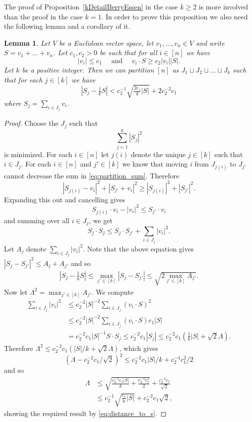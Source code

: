 \documentclass[10pt, english,oneside,reqno]{amsart}
\theoremstyle{plain}
\newtheorem{lemma}[theorem]{Lemma}
\theoremstyle{remark}
\numberwithin{equation}{section}
\numberwithin{figure}{section}
\begin{document}
The proof of Proposition~\ref{kDetailBerryEssen} in the case $k \geq 2$ is more involved than the proof in the case $k=1$. In order to prove this proposition we also need the following lemma and a corollary of it.

\begin{lemma}\label{EucVecLemma}
    Let $V$ be a Euclidean vector space, let $v_1, \dots, v_n \in V$ and write $S =  v_1 + \dots + v_n$. Let $c_1, c_2 > 0$ be such that for all $i \in [n]$ we have $$|v_i| \leq c_1 \quad \text{ and } \quad v_i \cdot S \geq c_2 |v_i| |S|.$$ Let $k$ be a positive integer. Then we can partition $[n]$ as $J_1 \sqcup J_2 \sqcup \dots \sqcup J_k$ such that for each $j \in [k]$ we have $$|S_j - \tfrac{1}{k}S| < c_2^{-1} \sqrt{\tfrac{2c_1}{k}|S|} + 2 c_2^{-2} c_1$$
    where $S_j = \sum_{i \in J_j} v_i$.
\end{lemma}

\begin{proof}
    Choose the $J_j$ such that 
    \begin{equation}
        \sum_{j=1}^{k} | S_j |^2 \label{eq:partition_sum}
    \end{equation} is minimized. For each $i \in [n]$ let $j(i)$ denote the unique $j \in [k]$ such that $i \in J_j$. For each $i \in [n]$ and $j' \in [k]$ we know that moving $i$ from $J_{j(i)}$ to $J_{j'}$ cannot decrease the sum in \eqref{eq:partition_sum}. Therefore
    $$|S_{j(i)} - v_i|^2 + |S_{j'} + v_i |^2 \geq |S_{j(i)}|^2 + |S_{j'}|^2.$$
    Expanding this out and cancelling gives $$S_{j(i)} \cdot v_i - |v_i|^2 \leq S_{j'} \cdot v_i$$ and summing over all $i \in J_j$, we get $$S_j \cdot S_j \leq S_j \cdot S_{j'} + \sum_{i \in J_j} |v_i|^2.$$ Let $A_j$ denote $ \sum_{i \in J_j} |v_i|^2$. Note that the above equation gives $|S_j - S_{j'}|^2 \leq A_j + A_{j'}$
    and so
    \begin{align}
        |S_j - \tfrac{1}{k}S| \leq \max_{j' \in [k]} |S_j - S_{j'}| 
        \leq \sqrt{2 \max_{j' \in [k]} A_{j'}}. \label{eq:distance_to_s} 
    \end{align}
    Now let $\Lambda^2 = \max_{j' \in [k]} A_{j'}$. We compute
    \begin{align*}
        \sum_{i \in J_j} |v_i|^2 & \leq c_2^{-2} |S|^{-2} \sum_{i \in J_j} (v_i \cdot S)^2 \\
        & \leq c_2^{-2} |S|^{-2} \sum_{i \in J_j} (v_i \cdot S) c_1 |S| \\
        & = c_2^{-2} c_1 |S|^{-1} S \cdot S_j
         \leq c_2^{-2} c_1 |S_j|
         \leq c_2^{-2} c_1 (\tfrac{1}{k}|S|  + \sqrt{2} \Lambda).
    \end{align*}
    Therefore $\Lambda^2 \leq c_2^{-2} c_1 (|S| / k + \sqrt{2} \Lambda)$, which gives $$\left(\Lambda - c_2^{-2} c_1 / \sqrt{2} \right)^2 \leq c_2^{-2} c_1 |S| / k + c_2^{-4} c_1^2 / 2$$ and so
    \begin{align*}
        \Lambda & \leq \sqrt{\frac{c_2^{-2} c_1 |S|}{k} + \frac{c_2^{-4} c_1^2} {2}} + \frac{c_2^{-2} c_1}{\sqrt{2}}\\
        & \leq c_2^{-1} \sqrt{\tfrac{c_1}{k} |S|} + c_2^{-2} c_1 \sqrt{2},
    \end{align*} showing the required result by \eqref{eq:distance_to_s}.
\end{proof}
\end{document}
